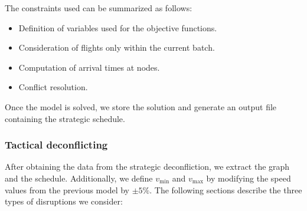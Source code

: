 \documentclass[../../thesis.tex]{subfiles}
\begin{document}
The constraints used can be summarized as follows:  
\begin{itemize}
    \item Definition of variables used for the objective functions.  
    \item Consideration of flights only within the current batch.  
    \item Computation of arrival times at nodes.  
    \item Conflict resolution.  
\end{itemize}

Once the model is solved, we store the solution and generate an output file containing the strategic schedule.  

\subsubsection{Tactical deconflicting}
After obtaining the data from the strategic deconfliction, we extract the graph and the schedule. Additionally, we define $v_{\min}$ and $v_{\max}$ by modifying the speed values from the previous model by $\pm 5\%$.
\newline
The following sections describe the three types of disruptions we consider:\newline
\end{document}
